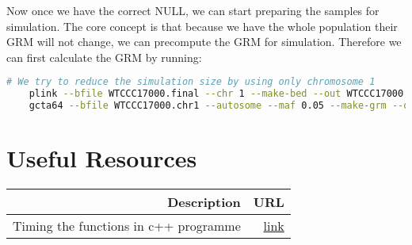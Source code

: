 \documentclass[12pt]{article}
\begin{document}
	Now once we have the correct NULL, we can start preparing the samples for simulation. 
	The core concept is that because we have the whole population their GRM will not change, we can precompute the GRM for simulation.
	Therefore we can first calculate the GRM by running:
	\begin{lstlisting}[language=bash]
	# We try to reduce the simulation size by using only chromosome 1
	plink --bfile WTCCC17000.final --chr 1 --make-bed --out WTCCC17000.chr1
	gcta64 --bfile WTCCC17000.chr1 --autosome --maf 0.05 --make-grm --out WTCCC17000.chr1.gcta --make-grm-gz --thread-num 10
	\end{lstlisting}
	\newpage
	\section{Useful Resources}
	\begin{table}[t]
		\centering
		\begin{tabular}{rr}
			\toprule
			Description & URL \\
			\midrule
			Timing the functions in c++ programme & \href{http://stackoverflow.com/a/21995693}{link}\\
			\bottomrule
		\end{tabular}
	\end{table}
\end{document}
